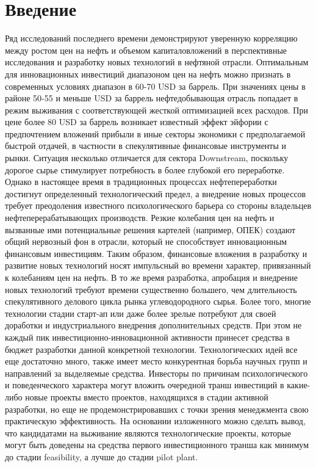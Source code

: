 \chapter{Введение}  

Ряд исследований последнего времени демонстрируют уверенную корреляцию между ростом цен на нефть и объемом капиталовложений в перспективные исследования и разработку новых технологий в нефтяной отрасли.
Оптимальным для инновационных инвестиций диапазоном цен на нефть можно признать в современных условиях диапазон в 60-70 USD за баррель.
При значениях цены в районе 50-55 и меньше USD за баррель нефтедобывающая отрасль попадает в режим выживания с соответствующей жесткой оптимизацией всех расходов.
При цене более 80 USD за баррель возникает известный эффект эйфории с предпочтением вложений прибыли в иные секторы экономики с предполагаемой быстрой отдачей, в частности в спекулятивные финансовые инструменты и рынки.
Ситуация несколько отличается для сектора Downstream, поскольку дорогое сырье стимулирует потребность в более глубокой его переработке.
Однако в настоящее время в традиционных процессах нефтепереработки достигнут определенный технологический предел, а внедрение новых процессов требует преодоления известного психологического барьера со стороны владельцев нефтеперерабатывающих производств.
Резкие колебания цен на нефть и вызванные ими потенциальные решения картелей (например, ОПЕК) создают общий нервозный фон в отрасли, который не способствует инновационным финансовым инвестициям.
Таким образом, финансовые вложения в разработку и развитие новых технологий носят импульсный во времени характер, привязанный к колебаниям цен на нефть.
В то же время разработка, апробация и внедрение новых технологий требуют времени существенно большего, чем длительность спекулятивного делового цикла рынка углеводородного сырья.
Более того, многие технологии стадии старт-ап или даже более зрелые потребуют для своей доработки и индустриального внедрения дополнительных средств.
При этом не каждый пик инвестиционно-инновационной активности принесет средства в бюджет разработки данной конкретной технологии.
Технологических идей все еще достаточно много, также имеет место конкурентная борьба научных групп и направлений за выделяемые средства.
Инвесторы по причинам психологического и поведенческого характера могут вложить очередной транш инвестиций в какие-либо новые проекты вместо проектов, находящихся в стадии активной разработки, но еще не продемонстрировавших с точки зрения менеджмента свою практическую эффективность.
На основании изложенного можно сделать вывод, что кандидатами на выживание являются технологические проекты, которые могут быть доведены на средства первого инвестиционного транша как минимум до стадии feasibility, а лучше до стадии pilot plant.

